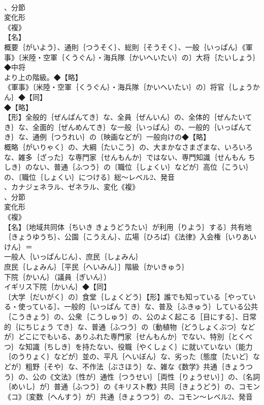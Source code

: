 \documentclass[8pt]{extreport}
\begin{document}
\begin{CJK}{UTF8}{min}
\\	、分節
\\	変化形 
\\	《複》
\\	【名】
\\	概要｛がいよう｝、通則｛つうそく｝、総則｛そうそく｝、一般｛いっぱん｝《軍事》〔米陸・空軍｛くうぐん｝・海兵隊｛かいへいたい｝の〕大将｛たいしょう｝◆中将
\\	より上の階級。◆【略】
\\	《軍事》〔米陸・空軍｛くうぐん｝・海兵隊｛かいへいたい｝の〕将官｛しょうかん｝◆【同】
\\	◆【略】
\\	【形】全般的｛ぜんぱんてき｝な、全員｛ぜんいん｝の、全体的｛ぜんたいてき｝な、全面的｛ぜんめんてき｝な一般｛いっぱん｝の、一般的｛いっぱんてき｝な、通例｛つうれい｝の〔映画などが〕一般向けの◆【略】
\\	概略｛がいりゃく｝の、大綱｛たいこう｝の、大まかなさまざまな、いろいろな、雑多｛ざった｝な専門家｛せんもんか｝ではない、専門知識｛せんもん ちしき｝のない、普通｛ふつう｝の〔職位｛しょくい｝などが〕高位｛こうい｝の、〔職位｛しょくい｝につける〕総～レベル2、発音
\\	、カナジェネラル、ゼネラル、変化《複》
\\	、分節
\\	変化形 
\\	《複》
\\	【名】〔地域共同体｛ちいき きょうどうたい｝が利用｛りよう｝する〕共有地｛きょうゆうち｝、公園｛こうえん｝、広場｛ひろば｝《法律》入会権｛いりあいけん｝＝ 
\\	一般人｛いっぱんじん｝、庶民｛しょみん｝
\\	庶民｛しょみん｝［平民｛へいみん｝］階級｛かいきゅう｝
\\	下院｛かいん｝（議員｛ぎいん｝）
\\	イギリス下院｛かいん｝◆【同】
\\	〔大学｛だいがく｝の〕食堂｛しょくどう｝【形】誰でも知っている［やっている・使っている］、一般的｛いっぱん てき｝な、普及｛ふきゅう｝している公共｛こうきょう｝の、公衆｛こうしゅう｝の、公のよく起こる［目にする］、日常的｛にちじょう てき｝な、普通｛ふつう｝の〔動植物｛どうしょくぶつ｝などが〕どこにでもいる、ありふれた専門家｛せんもんか｝でない、特別｛とくべつ｝な知識｛ちしき｝を持たない、役職｛やくしょく｝に就いていない〔能力｛のうりょく｝などが〕並の、平凡｛へいぼん｝な、劣った〔態度｛たいど｝などが〕粗野｛そや｝な、不作法｛ぶさほう｝な、雑な《数学》共通｛きょうつう｝の、公の《文法》〔性が〕通性｛つうせい｝［両性｛りょうせい｝］の、〔名詞｛めいし｝が〕普通｛ふつう｝の《キリスト教》共同｛きょうどう｝の、コモン《コ》〔変数｛へんすう｝が〕共通｛きょうつう｝の、コモン～レベル2、発音

\end{CJK}
\end{document}
